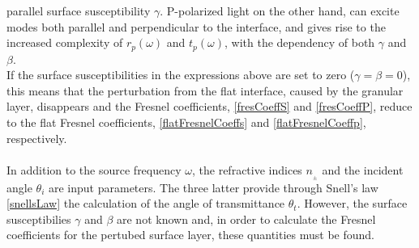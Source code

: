 parallel surface susceptibility $\gamma$.
P-polarized light on the other hand, can excite modes both parallel and perpendicular to the 
interface, and gives rise to the increased complexity of $r_p(\omega)$ and $t_p(\omega)$, with the
dependency of both $\gamma$ and $\beta$. \\
If the surface susceptibilities in the expressions above are set to zero ($\gamma = \beta = 0$),
this means that the perturbation from the flat interface, caused by the granular layer, 
disappears and
the Fresnel coefficients, \eqref{fresCoeffS} and \eqref{fresCoeffP}, reduce to the flat Fresnel 
coefficients, \eqref{flatFresnelCoeffs} and \eqref{flatFresnelCoeffp}, respectively.
\\
\\
In addition to the source frequency $\omega$, the refractive indices $n_{_{\pm}}$ and the incident
angle $\theta_i$ are input parameters. The three latter provide through Snell's law \eqref{snellsLaw} 
the calculation of the angle of transmittance $\theta_t$.
However, the surface susceptibilies $\gamma$ and $\beta$ are not known and, 
in order to calculate the Fresnel coefficients for the pertubed surface layer, 
these quantities must be found.


